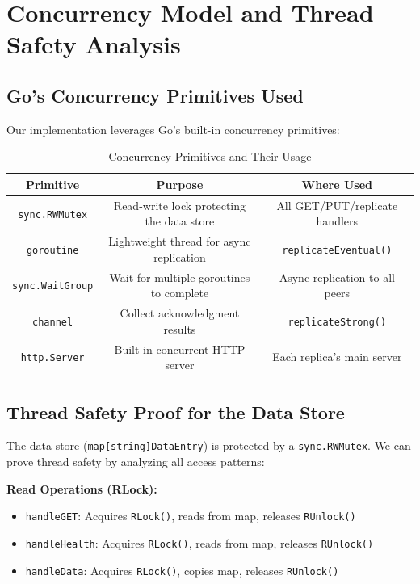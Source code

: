 \documentclass[10pt,a4paper]{article}
\begin{document}
\newpage


\section{Concurrency Model and Thread Safety Analysis}

\subsection{Go's Concurrency Primitives Used}

Our implementation leverages Go's built-in concurrency primitives:

\begin{table}[H]
\centering
\caption{Concurrency Primitives and Their Usage}
\begin{tabular}{|c|c|c|}
\hline
\textbf{Primitive} & \textbf{Purpose} & \textbf{Where Used} \\
\hline
\texttt{sync.RWMutex} & Read-write lock protecting the data store & All GET/PUT/replicate handlers \\
\hline
\texttt{goroutine} & Lightweight thread for async replication & \texttt{replicateEventual()} \\
\hline
\texttt{sync.WaitGroup} & Wait for multiple goroutines to complete & Async replication to all peers \\
\hline
\texttt{channel} & Collect acknowledgment results & \texttt{replicateStrong()} \\
\hline
\texttt{http.Server} & Built-in concurrent HTTP server & Each replica's main server \\
\hline
\end{tabular}
\end{table}

\subsection{Thread Safety Proof for the Data Store}

The data store (\texttt{map[string]DataEntry}) is protected by a \texttt{sync.RWMutex}. We can prove thread safety by analyzing all access patterns:

\textbf{Read Operations (RLock):}
\begin{itemize}
    \item \texttt{handleGET}: Acquires \texttt{RLock()}, reads from map, releases \texttt{RUnlock()}
    \item \texttt{handleHealth}: Acquires \texttt{RLock()}, reads from map, releases \texttt{RUnlock()}
    \item \texttt{handleData}: Acquires \texttt{RLock()}, copies map, releases \texttt{RUnlock()}
\end{itemize}
\end{document}
